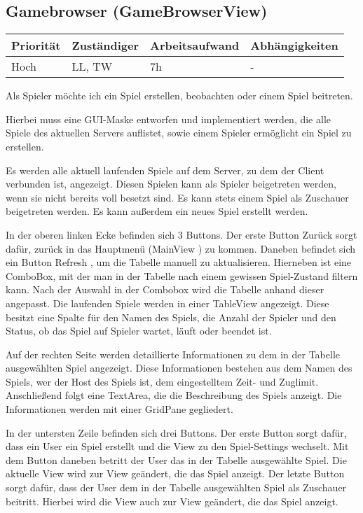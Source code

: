 \documentclass[a4paper]{scrreprt}
\newenvironment{requirement}[5] {
	\subsection{#1}
	\begin{tabularx}{\textwidth}{|X|l|X|X|}
		\hline
		Priorität & Zuständiger & Arbeitsaufwand & Abhängigkeiten \\
		\hline
		#2 & #3 & #4 & #5 \\
		\hline
	\end{tabularx}
	}{
	\newpage
	}
\begin{document}
\begin{requirement}{Gamebrowser (GameBrowserView)}{Hoch}{LL, TW}{7h}{-}

\begin{center}
	Als Spieler möchte ich ein Spiel erstellen, beobachten oder einem Spiel beitreten.
\end{center}

Hierbei muss eine GUI-Maske entworfen und implementiert werden, die alle Spiele des aktuellen Servers auflistet, sowie einem Spieler ermöglicht ein Spiel zu erstellen.

Es werden alle aktuell laufenden Spiele auf dem Server, zu dem der Client verbunden ist, angezeigt. Diesen Spielen kann als Spieler beigetreten werden, wenn sie nicht bereits voll besetzt sind. Es kann stets einem Spiel als Zuschauer beigetreten werden. Es kann außerdem ein neues Spiel erstellt werden.

In der oberen linken Ecke befinden sich 3 Buttons. Der erste Button \glqq Zurück \grqq{} sorgt dafür, zurück in das Hauptmenü (\glqq MainView \grqq{}) zu kommen.
Daneben befindet sich ein Button \glqq Refresh \grqq{}, um die Tabelle manuell zu aktualisieren.
Hierneben ist eine ComboBox, mit der man in der Tabelle nach einem gewissen Spiel-Zustand filtern kann. Nach der Auswahl in der Combobox wird die Tabelle anhand dieser angepasst.
Die laufenden Spiele werden in einer TableView angezeigt. Diese besitzt eine Spalte für den Namen des Spiels, die Anzahl der Spieler und den Status, ob das Spiel auf Spieler wartet, läuft oder beendet ist.

Auf der rechten Seite werden detaillierte Informationen zu dem in der Tabelle ausgewählten Spiel angezeigt. Diese Informationen bestehen aus dem Namen des Spiels, wer der Host des Spiels ist, dem eingestelltem Zeit- und Zuglimit. Anschließend folgt eine TextArea, die die Beschreibung des Spiels anzeigt.
Die Informationen werden mit einer GridPane gegliedert.

In der untersten Zeile befinden sich drei Buttons.
Der erste Button sorgt dafür, dass ein User ein Spiel erstellt und die View zu den Spiel-Settings wechselt.
Mit dem Button daneben betritt der User das in der Tabelle ausgewählte Spiel. Die aktuelle View wird zur View geändert, die das Spiel anzeigt.
Der letzte Button sorgt dafür, dass der User dem in der Tabelle ausgewählten Spiel als Zuschauer beitritt. Hierbei wird die View auch zur View geändert, die das Spiel anzeigt.

\end{requirement}
\end{document}
